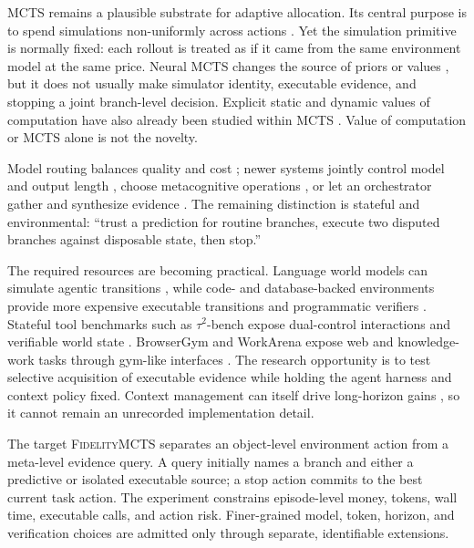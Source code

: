 \documentclass[10pt,twocolumn]{article}
\newcommand{\method}{\textsc{FidelityMCTS}\xspace}
\begin{document}
MCTS remains a plausible substrate for adaptive allocation. Its central purpose is
to spend simulations non-uniformly across actions
\citep{kocsis2006bandit,browne2012survey}. Yet the simulation primitive is
normally fixed: each rollout is treated as if it came from the same environment
model at the same price. Neural MCTS changes the source of priors or values
\citep{silver2016alphago,silver2017zero,schrittwieser2020muzero}, but it does not
usually make simulator identity, executable evidence, and stopping a joint
branch-level decision. Explicit static and dynamic values of computation have
also already been studied within MCTS \citep{sezener2020voc}. Value of
computation or MCTS alone is not the novelty.

Model routing balances quality and cost \citep{ong2025routellm}; newer systems
jointly control model and output length \citep{xue2026r2router}, choose
metacognitive operations \citep{ma2026cot2meta}, or let an orchestrator gather
and synthesize evidence \citep{qin2026atlas}. The remaining distinction is
stateful and environmental: ``trust a prediction for routine branches, execute
two disputed branches against disposable state, then stop.''

The required resources are becoming practical. Language world models can
simulate agentic transitions \citep{zuo2026qwenagentworld,gu2025webdreamer},
while code- and database-backed environments provide more expensive executable
transitions and programmatic verifiers \citep{wang2026agentworld}. Stateful
tool benchmarks such as $\tau^2$-bench expose dual-control interactions and
verifiable world state \citep{barres2025tau2}. BrowserGym and WorkArena expose
web and knowledge-work tasks through gym-like interfaces
\citep{le2025browsergym,drouin2024workarena}. The research opportunity is to
test selective acquisition of executable evidence while holding the agent
harness and context policy fixed. Context management can itself drive
long-horizon gains \citep{lin2026context}, so it cannot remain an unrecorded
implementation detail.

The target \method separates an object-level environment action from a
meta-level evidence query. A query initially names a branch and either a
predictive or isolated executable source; a stop action commits to the best
current task action. The experiment constrains episode-level money, tokens,
wall time, executable calls, and action risk. Finer-grained model, token,
horizon, and verification choices are admitted only through separate,
identifiable extensions.
\end{document}
